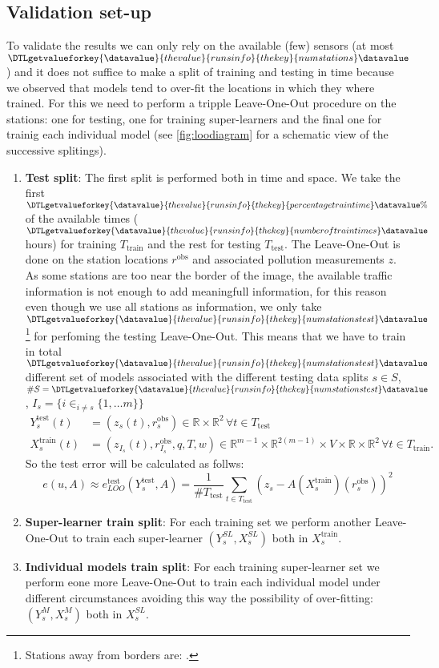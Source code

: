 \documentclass[11pt,a4paper,twoside]{article}
\newcommand{\perplexityinsert}[1]{\DTLgetvalueforkey{\datavalue}{thevalue}{runsinfo}{thekey}{#1}\datavalue}
\newcommand{\asmodif}[2]{{\color{teal} #1} {\sout{#2}}}
\theoremstyle{definition}
\numberwithin{equation}{section}
\newcommand{\bR}{\ensuremath{\mathbb{R}}}
\newcommand{\<}{\langle}
\renewcommand{\>}{\rangle}
\newcommand{\obs}{\ensuremath{\text{obs}}}
\newcommand{\test}{\text{test}}
\newcommand{\train}{\text{train}}
\begin{document}
\subsection{Validation set-up}
\asmodif{
To validate the results we can only rely on the available (few) sensors (at most $\perplexityinsert{numstations}$) and it does not suffice to make a split of training and testing in time because we observed that models tend to over-fit the locations in which they where trained. For this we need to perform a tripple Leave-One-Out procedure on the stations: one for testing, one for training super-learners and the final one for trainig each individual model (see \cref{fig:loodiagram} for a schematic view of the successive splitings).
\begin{enumerate}
	\item \textbf{Test split}: The first split is performed both in time and space. We take the first $\perplexityinsert{percentagetraintime}\%$ of the available times ($\perplexityinsert{numberoftraintimes}$ hours) for training $T_{\train}$ and the rest for testing $T_{\test}$. The Leave-One-Out is done on the station locations $r^\obs$ and associated pollution measurements $z$. As some stations are too near the border of the image, the available traffic information is not enough to add meaningfull information, for this reason even though we use all stations as information, we only take $\perplexityinsert{numstationstest}$\footnote{Stations away from borders are: \perplexityinsert{stationstest}.} for perfoming the testing Leave-One-Out. This means that we have to train in total $\perplexityinsert{numstationstest}$ different set of models associated with the different testing data splits $s\in S$, $\#S=\perplexityinsert{numstationstest}$, $I_s=\{i \in_{i \neq s} \{1, \dots m\}\}$
\begin{align}
	Y^{\test}_s(t) &= (z_s(t), r^\obs_s) \in \bR \times \bR^{2} \, \forall t \in T_{\test} \\
	X^{\train}_s(t) &= (z_{I_s}(t), r^\obs_{I_s}, q, T, w) \in \bR^{m-1} \times \bR^{2(m-1)} \times V \times \bR\times \bR^2 \, \forall t \in T_{\train}.	
\end{align}
	So the test error will be calculated as follws:
	$$e(u,A) \approx e^{\test}_{LOO}(Y^{\test}_s, A) = \frac{1}{\#T_{\test}}\sum_{t\in T_{\test}}\left(z_s-A(X^{\train}_s)(r^\obs_s)\right)^2$$
    \item \textbf{Super-learner train split}: For each training set we perform another Leave-One-Out to train each super-learner $(Y^{SL}_s, X^{SL}_s)$ both in $X^{\train}_s$.
    \item \textbf{Individual models train split}: For each training super-learner set we perform eone more Leave-One-Out to train each individual model under different circumstances avoiding this way the possibility of over-fitting: $(Y^{M}_s, X^{M}_s)$ both in $X^{SL}_s$.
\end{enumerate}
}{}
\end{document}
